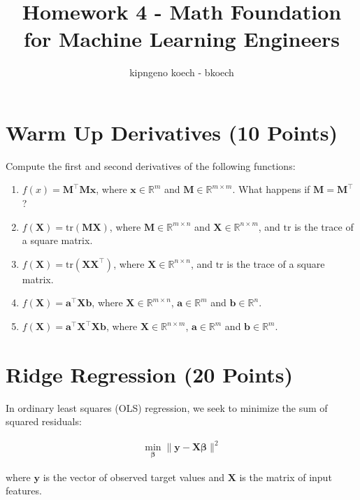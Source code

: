 \documentclass{article}
\begin{document}
\author{kipngeno koech - bkoech}
\title{Homework 4 - Math Foundation for Machine Learning Engineers}   
\maketitle

\medskip


\section{Warm Up Derivatives (10 Points)}
Compute the first and second derivatives of the following functions:
\begin{enumerate}
    \item $f(x) = \mathbf{M}^\top \mathbf{M} \mathbf{x}$, where $\mathbf{x} \in \mathbb{R}^m$ and $\mathbf{M} \in \mathbb{R}^{m \times m}$. What happens if $\mathbf{M} = \mathbf{M}^\top$?
    \item $f(\mathbf{X}) = \text{tr}(\mathbf{M}\mathbf{X})$, where $\mathbf{M} \in \mathbb{R}^{m \times n}$ and $\mathbf{X} \in \mathbb{R}^{n \times m}$, and $\text{tr}$ is the trace of a square matrix.
    \item $f(\mathbf{X}) = \text{tr}(\mathbf{X} \mathbf{X}^\top)$, where $\mathbf{X} \in \mathbb{R}^{n \times n}$, and $\text{tr}$ is the trace of a square matrix.
    \item $f(\mathbf{X}) = \mathbf{a}^\top \mathbf{X} \mathbf{b}$, where $\mathbf{X} \in \mathbb{R}^{m \times n}$, $\mathbf{a} \in \mathbb{R}^m$ and $\mathbf{b} \in \mathbb{R}^n$.
    \item $f(\mathbf{X}) = \mathbf{a}^\top \mathbf{X}^\top \mathbf{X} \mathbf{b}$, where $\mathbf{X} \in \mathbb{R}^{n \times m}$, $\mathbf{a} \in \mathbb{R}^m$ and $\mathbf{b} \in \mathbb{R}^m$.
\end{enumerate}

\section{Ridge Regression (20 Points)}
In ordinary least squares (OLS) regression, we seek to minimize the sum of squared residuals:

\begin{align}
\min_{\boldsymbol{\beta}} \|\mathbf{y} - \mathbf{X} \boldsymbol{\beta} \|^2
\end{align}

where $\mathbf{y}$ is the vector of observed target values and $\mathbf{X}$ is the matrix of input features.
\end{document}
